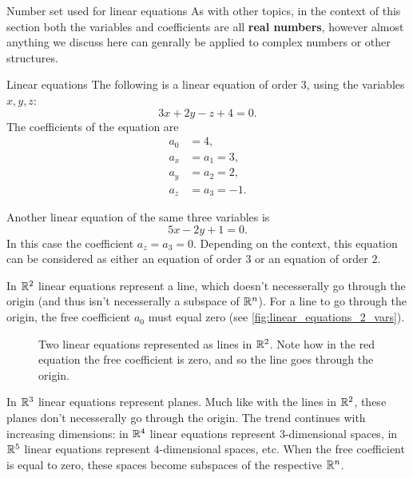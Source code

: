 \begin{note}{Number set used for linear equations}{}
	As with other topics, in the context of this section both the variables and coefficients are all \textbf{real numbers}, however almost anything we discuss here can genrally be applied to complex numbers or other structures.
\end{note}

\begin{example}{Linear equations}{}
	The following is a linear equation of order $3$, using the variables $x,y,z$:
	\[
		3x+2y-z+4 = 0.
	\]
	The coefficients of the equation are
	\begin{align*}
		a_{0}&=4,\\
		a_{x}&=a_{1}=3,\\
		a_{y}&=a_{2}=2,\\
		a_{z}&=a_{3}=-1.
	\end{align*}

	Another linear equation of the same three variables is
	\[
		5x-2y+1 = 0.
	\]
	In this case the coefficient $a_{z}=a_{3}=0$. Depending on the context, this equation can be considered as either an equation of order $3$ or an equation of order $2$.
\end{example}

In $\mathbb{R}^{2}$ linear equations represent a line, which doesn't necesserally go through the origin (and thus isn't necesserally a subspace of $\mathbb{R}^{n}$). For a line to go through the origin, the free coefficient $a_{0}$ must equal zero (see \autoref{fig:linear_equations_2_vars}).

\begin{figure}
	\centering
	\caption{Two linear equations represented as lines in $\mathbb{R}^{2}$. Note how in the red equation the free coefficient is zero, and so the line goes through the origin.}
	\label{fig:linear_equations_2_vars}
\end{figure}

In $\mathbb{R}^{3}$ linear equations represent planes. Much like with the lines in $\mathbb{R}^{2}$, these planes don't necesserally go through the origin. The trend continues with increasing dimensions: in $\mathbb{R}^{4}$ linear equations represent $3$-dimensional spaces, in $\mathbb{R}^{5}$ linear equations represent $4$-dimensional spaces, etc. When the free coefficient is equal to zero, these spaces become subspaces of the respective $\mathbb{R}^{n}$.
		
